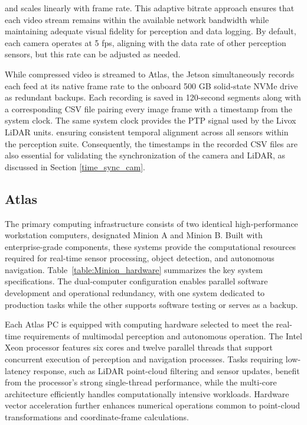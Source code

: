 \documentclass[../main.tex]{subfiles}
\begin{document}
and scales linearly with frame rate.
This adaptive bitrate approach ensures that each video stream remains within the available network bandwidth while maintaining adequate visual fidelity for perception and data logging.
By default, each camera operates at 5 \ac{fps}, aligning with the data rate of other perception sensors, but this rate can be adjusted as needed. %



While compressed video is streamed to Atlas, the Jetson simultaneously records each feed at its native frame rate to the onboard 500 GB solid-state NVMe drive as redundant backups. 
Each recording is saved in 120-second segments along with a corresponding \ac{CSV} file pairing every image frame with a timestamp from the system clock. 
The same system clock provides the \ac{PTP} signal used by the Livox LiDAR units. ensuring consistent temporal alignment across all sensors within the perception suite. 
Consequently, the timestamps in the recorded \ac{CSV} files are also essential for validating the synchronization of the camera and LiDAR, as discussed in Section \ref{time_sync_cam}.



\subsection{Atlas} \label{atlas}

The primary computing infrastructure consists of two identical high-performance workstation computers, designated Minion A and Minion B.  
Built with enterprise-grade components, these systems provide the computational resources required for real-time sensor processing, object detection, and autonomous navigation.
Table~\ref{table:Minion_hardware} summarizes the key system specifications.
The dual-computer configuration enables parallel software development and operational redundancy, with one system dedicated to production tasks while the other supports software testing or serves as a backup.
 

Each Atlas PC is equipped with computing hardware selected to meet the real-time requirements of multimodal perception and autonomous operation.  
The Intel Xeon processor features six cores and twelve parallel threads that support concurrent execution of perception and navigation processes.  
Tasks requiring low-latency response, such as LiDAR point-cloud filtering and sensor updates, benefit from the processor’s strong single-thread performance, while the multi-core architecture efficiently handles computationally intensive workloads.  
Hardware vector acceleration further enhances numerical operations common to point-cloud transformations and coordinate-frame calculations.
\end{document}
